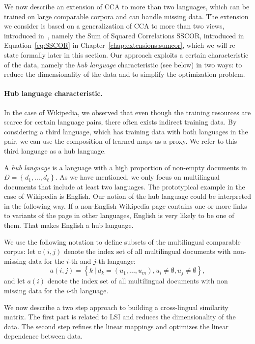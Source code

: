 We now describe an extension of CCA to more than two languages, which can be trained on 
large comparable corpora and can handle missing data. The extension we consider is based on 
a generalization of CCA to more than two views, introduced in~\cite{Kettenring}, namely 
the Sum of Squared Correlations SSCOR, introduced in Equation~\ref{eq:SSCOR} in 
Chapter~\ref{chap:extensions:sumcor}, which we will re-state formally later in this section. 
Our approach exploits a certain characteristic of the data, namely the \emph{hub language} 
characteristic (see below) in two ways: to reduce the dimensionality of the data and to 
simplify the optimization problem.

\paragraph{Hub language characteristic.}
In the case of Wikipedia, we observed that even though the training resources are scarce 
for certain language pairs, there often exists indirect training data. By considering 
a third language, which has training data with both languages in the pair,  we can use 
the composition of learned maps as a proxy. We refer to this third language as a hub language.

A \emph{hub language} is a language with a high proportion of non-empty documents in 
$D = \left\{d_1,..., d_{\ell}\right\}$. As we have mentioned, we only focus on multilingual 
documents that include at least two languages. The prototypical example in the case of 
Wikipedia is English. Our notion of the hub language could be interpreted in the following 
way. If a non-English Wikipedia page contains one or more links to variants of the page in 
other languages, English is very likely to be one of them. That makes English a hub language.

We use the following notation to define subsets of the multilingual comparable corpus: 
let $a(i,j)$ denote the index set of all multilingual documents with non-missing data 
for the $i$-th and $j$-th language: 
$$a(i,j) = \left\{k~ |~ d_k = (u_1,...,u_m), u_i \neq \emptyset, u_j \neq \emptyset \right\},$$ 
and let $a(i)$ denote the index set of all multilingual documents with non missing data 
for the $i$-th language.

We now describe a two step approach to building a cross-lingual similarity matrix. 
The first part is related to LSI and reduces the dimensionality of the data. The second 
step refines the linear mappings and optimizes the linear dependence between data.

